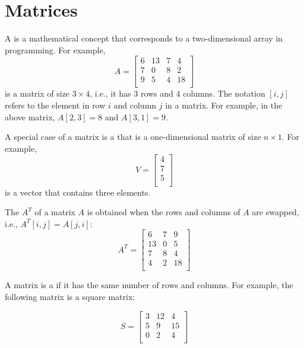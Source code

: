 \chapter{Matrices}


A  is a mathematical concept
that corresponds to a two-dimensional array
in programming. For example,
\[
    A =
    \begin{bmatrix}
        6 & 13 & 7 & 4  \\
        7 & 0  & 8 & 2  \\
        9 & 5  & 4 & 18 \\
    \end{bmatrix}
\]
is a matrix of size $3 \times 4$, i.e.,
it has 3 rows and 4 columns.
The notation $[i,j]$ refers to
the element in row $i$ and column $j$
in a matrix.
For example, in the above matrix,
$A[2,3]=8$ and $A[3,1]=9$.


A special case of a matrix is a 
that is a one-dimensional matrix of size $n \times 1$.
For example,
\[
    V =
    \begin{bmatrix}
        4 \\
        7 \\
        5 \\
    \end{bmatrix}
\]
is a vector that contains three elements.


The  $A^T$ of a matrix $A$
is obtained when the rows and columns of $A$
are swapped, i.e., $A^T[i,j]=A[j,i]$:
\[
    A^T =
    \begin{bmatrix}
        6  & 7 & 9  \\
        13 & 0 & 5  \\
        7  & 8 & 4  \\
        4  & 2 & 18 \\
    \end{bmatrix}
\]


A matrix is a  if it
has the same number of rows and columns.
For example, the following matrix is a
square matrix:

\[
    S =
    \begin{bmatrix}
        3 & 12 & 4  \\
        5 & 9  & 15 \\
        0 & 2  & 4  \\
    \end{bmatrix}
\]


